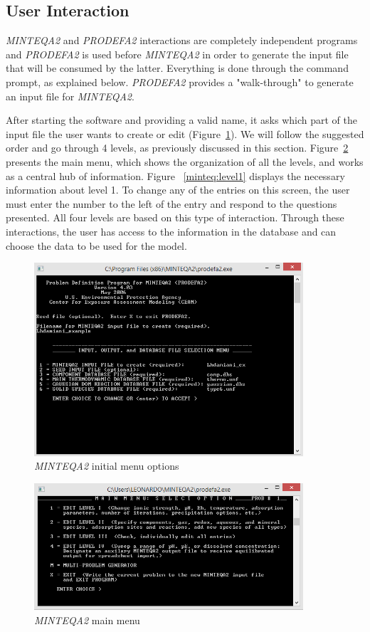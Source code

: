 \subsection{User Interaction}\label{minteq:interactions}
\emph{MINTEQA2} and \emph{PRODEFA2} interactions are completely independent programs and \emph{PRODEFA2} is used before \emph{MINTEQA2} in order to generate the input file that will be consumed by the latter. Everything is done through the command prompt, as explained below. \emph{PRODEFA2} provides a "walk-through" to generate an input file for \emph{MINTEQA2}.

After starting the software and providing a valid name, it asks which part of the input file the user wants to create or edit (Figure~\ref{minteq:init}). We will follow the suggested order and go through 4 levels, as previously discussed in this section. Figure~\ref{minteq:level0} presents the main menu, which shows the organization of all the levels, and works as a central hub of information. Figure ~\ref{minteq:level1} displays the necessary information about level 1. To change any of the entries on this screen, the user must enter the number to the left of the entry and respond to the questions presented. All four levels are based on this type of interaction. Through these interactions, the user has access to the information in the database and can choose the data to be used for the model.

\begin{figure}[ht!]
\centering
\includegraphics[width=100mm]{figures/minteq-init.png}
\caption{\emph{MINTEQA2} initial menu options}
\label{minteq:init}
\end{figure}

\begin{figure}[ht!]
\centering
\includegraphics[width=100mm]{figures/minteq-level0.png}
\caption{\emph{MINTEQA2} main menu}
\label{minteq:level0}
\end{figure}

